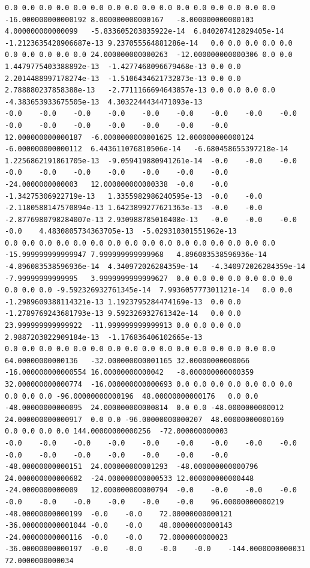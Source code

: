 \documentclass[12pt]{report} %
\begin{document}
\begin{landscape}
\begin{lstlisting}[numbers=none, basicstyle=\ttfamily\tiny, captionpos=b, caption={Matriz de coeficientes $W = G^{-1}$ ($54\times54$) calculada con Julia, sin redondear.}, label=cod:W-julia]
0.0	0.0	0.0	0.0	0.0	0.0	0.0	0.0	0.0	0.0	0.0	0.0	0.0	0.0	0.0	0.0	-16.000000000000192	8.000000000000167	-8.000000000000103	4.000000000000099	-5.833605203835922e-14	6.840207412829405e-14	-1.2123635428906687e-13	9.237055564881286e-14	0.0	0.0	0.0	0.0	0.0	0.0	0.0	0.0	0.0	0.0	24.000000000000263	-12.000000000000306	0.0	0.0	1.4479775403388892e-13	-1.4277468096679468e-13	0.0	0.0	2.2014488997178274e-13	-1.5106434621732873e-13	0.0	0.0	2.788880237858388e-13	-2.7711166694643857e-13	0.0	0.0	0.0	0.0	-4.383653933675505e-13	4.3032244434471093e-13
-0.0	-0.0	-0.0	-0.0	-0.0	-0.0	-0.0	-0.0	-0.0	-0.0	-0.0	-0.0	-0.0	-0.0	-0.0	-0.0	12.000000000000187	-6.0000000000001625	12.000000000000124	-6.000000000000112	6.443611076810506e-14	-6.680458655397218e-14	1.2256862191861705e-13	-9.059419880941261e-14	-0.0	-0.0	-0.0	-0.0	-0.0	-0.0	-0.0	-0.0	-0.0	-0.0	-24.0000000000003	12.000000000000338	-0.0	-0.0	-1.34275306922719e-13	1.3355982986240595e-13	-0.0	-0.0	-2.1180588147570894e-13	1.6423899277621363e-13	-0.0	-0.0	-2.8776980798284007e-13	2.930988785010408e-13	-0.0	-0.0	-0.0	-0.0	4.4830805734363705e-13	-5.029310301551962e-13
0.0	0.0	0.0	0.0	0.0	0.0	0.0	0.0	0.0	0.0	0.0	0.0	0.0	0.0	0.0	0.0	-15.999999999999947	7.999999999999968	4.896083538596936e-14	-4.896083538596936e-14	4.340972026284359e-14	-4.340972026284359e-14	-7.99999999999995	3.9999999999999627	0.0	0.0	0.0	0.0	0.0	0.0	0.0	0.0	0.0	0.0	-9.592326932761345e-14	7.993605777301121e-14	0.0	0.0	-1.2989609388114321e-13	1.1923795284474169e-13	0.0	0.0	-1.2789769243681793e-13	9.592326932761342e-14	0.0	0.0	23.999999999999922	-11.999999999999913	0.0	0.0	0.0	0.0	2.9887203822909184e-13	-1.176836406102665e-13
0.0	0.0	0.0	0.0	0.0	0.0	0.0	0.0	0.0	0.0	0.0	0.0	0.0	0.0	0.0	0.0	64.00000000000136	-32.000000000001165	32.00000000000066	-16.000000000000554	16.00000000000042	-8.000000000000359	32.000000000000774	-16.000000000000693	0.0	0.0	0.0	0.0	0.0	0.0	0.0	0.0	0.0	0.0	-96.00000000000196	48.00000000000176	0.0	0.0	-48.00000000000095	24.000000000000814	0.0	0.0	-48.0000000000012	24.000000000000917	0.0	0.0	-96.00000000000207	48.00000000000169	0.0	0.0	0.0	0.0	144.00000000000256	-72.000000000003
-0.0	-0.0	-0.0	-0.0	-0.0	-0.0	-0.0	-0.0	-0.0	-0.0	-0.0	-0.0	-0.0	-0.0	-0.0	-0.0	-48.00000000000151	24.000000000001293	-48.000000000000796	24.000000000000682	-24.000000000000533	12.000000000000448	-24.0000000000009	12.000000000000794	-0.0	-0.0	-0.0	-0.0	-0.0	-0.0	-0.0	-0.0	-0.0	-0.0	96.00000000000219	-48.00000000000199	-0.0	-0.0	72.00000000000121	-36.000000000001044	-0.0	-0.0	48.00000000000143	-24.00000000000116	-0.0	-0.0	72.0000000000023	-36.00000000000197	-0.0	-0.0	-0.0	-0.0	-144.0000000000031	72.0000000000034

\end{lstlisting}
\end{landscape}
\end{document}
